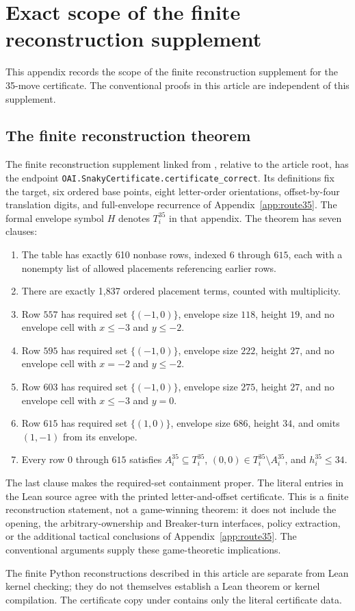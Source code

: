 \section{Exact scope of the finite reconstruction supplement}
\label{app:formal}\label{rformal:main}

This appendix records the scope of the finite reconstruction supplement
for the 35-move certificate.  The conventional proofs in this article
are independent of this supplement.

\subsection{The finite reconstruction theorem}
\label{rformal:evidence}

The finite reconstruction supplement linked from
, relative to the
article root, has the endpoint
\texttt{OAI.SnakyCertificate.certificate\_correct}.  Its definitions fix
the target, six ordered base points, eight letter-order orientations,
offset-by-four translation digits, and full-envelope recurrence of
Appendix~\ref{app:route35}.  The formal envelope symbol $H$ denotes
$T_i^{35}$ in that appendix.  The theorem has seven clauses:
\begin{enumerate}
\item The table has exactly 610 nonbase rows, indexed $6$ through
$615$, each with a nonempty list of allowed placements referencing
earlier rows.
\item There are exactly 1,837 ordered placement terms, counted with
multiplicity.
\item Row $557$ has required set $\{(-1,0)\}$, envelope size $118$,
height $19$, and no envelope cell with $x\leq-3$ and $y\leq-2$.
\item Row $595$ has required set $\{(-1,0)\}$, envelope size $222$,
height $27$, and no envelope cell with $x=-2$ and $y\leq-2$.
\item Row $603$ has required set $\{(-1,0)\}$, envelope size $275$,
height $27$, and no envelope cell with $x\leq-3$ and $y=0$.
\item Row $615$ has required set $\{(1,0)\}$, envelope size $686$,
height $34$, and omits $(1,-1)$ from its envelope.
\item Every row $0$ through $615$ satisfies
$A_i^{35}\subseteq T_i^{35}$,
$(0,0)\in T_i^{35}\setminus A_i^{35}$, and $h_i^{35}\leq34$.
\end{enumerate}
The last clause makes the required-set containment proper.  The
literal entries in the Lean source agree with the printed
letter-and-offset certificate.  This is a finite reconstruction
statement, not a game-winning theorem: it does not include the opening,
the arbitrary-ownership and Breaker-turn interfaces, policy extraction,
or the additional tactical conclusions of Appendix~\ref{app:route35}.
The conventional arguments supply these game-theoretic implications.

The finite Python reconstructions described in this article are separate
from Lean kernel checking; they do not themselves establish a Lean theorem
or kernel compilation.  The certificate copy under
 contains only the literal certificate data.
